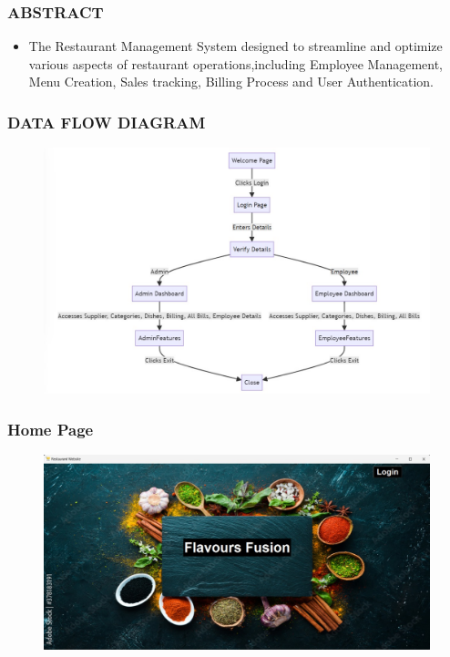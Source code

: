 \documentclass{beamer}
\begin{document}
\begin{frame}
  \frametitle{ABSTRACT}

  \begin{itemize} \item The Restaurant Management System designed to streamline and optimize various aspects of restaurant operations,including Employee Management, Menu Creation, Sales tracking, Billing Process and User Authentication.
  \end{itemize}
\end{frame}




\begin{frame}
   \frametitle{DATA FLOW DIAGRAM}
   \begin{figure}
      \centering
      \includegraphics[width=1.1\linewidth]{dataflow.jpg}
    \end{figure}
\end{frame}  

\begin{frame}
  \frametitle{Home Page}
  \begin{figure}
    \centering
    \includegraphics[width=1.0\linewidth]{homepage.jpg} 
  \end{figure}
\end{frame}
\end{document}
